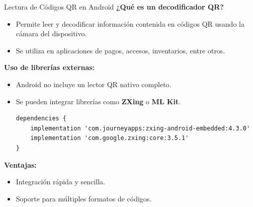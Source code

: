 
\begin{frame}[fragile]{Lectura de Códigos QR en Android}
\textbf{¿Qué es un decodificador QR?}

\begin{itemize}
    \item Permite leer y decodificar información contenida en códigos QR usando la cámara del dispositivo.
    \item Se utiliza en aplicaciones de pagos, accesos, inventarios, entre otros.
\end{itemize}

\textbf{Uso de librerías externas:}
\begin{itemize}
    \item Android no incluye un lector QR nativo completo.
    \item Se pueden integrar librerías como \textbf{ZXing} o \textbf{ML Kit}.

\scriptsize
\begin{verbatim}
dependencies {
    implementation 'com.journeyapps:zxing-android-embedded:4.3.0'
    implementation 'com.google.zxing:core:3.5.1'
}
\end{verbatim}

\end{itemize}

\textbf{Ventajas:}
\begin{itemize}
    \item Integración rápida y sencilla.
    \item Soporte para múltiples formatos de códigos.
\end{itemize}

\end{frame}



